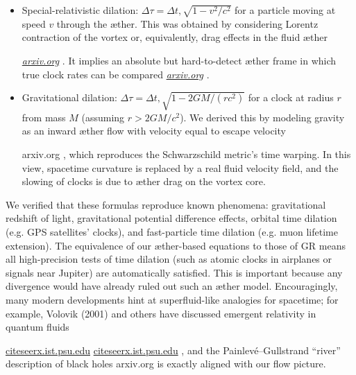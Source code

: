 \documentclass[aps,preprint,superscriptaddress]{revtex4}
\begin{document}
\begin{itemize}

\item
Special-relativistic dilation: $\displaystyle \Delta \tau = \Delta t,\sqrt{1-v^2/c^2}$ for a particle moving at speed $v$ through the æther. This was obtained by considering Lorentz contraction of the vortex or, equivalently, drag effects in the fluid æther

\href{https://arxiv.org/pdf/2012.07395#:~:text=which%20contains%20the%20familiar%20Lorentz,the%20Lorentz%20factor}{\textit{arxiv.org}}
. It implies an absolute but hard-to-detect æther frame in which true clock rates can be compared
\href{https://arxiv.org/pdf/physics/0611077#:~:text=We%20should%20note%20that%2C%20when,a%20state%20of%20absolute%20rest}{\textit{arxiv.org}}
.




\item
Gravitational dilation: $\displaystyle \Delta \tau = \Delta t,\sqrt{1-2GM/(r c^2)}$ for a clock at radius $r$ from mass $M$ (assuming $r>2GM/c^2$). We derived this by modeling gravity as an inward æther flow with velocity equal to escape velocity

arxiv.org
, which reproduces the Schwarzschild metric’s time warping. In this view, spacetime curvature is replaced by a real fluid velocity field, and the slowing of clocks is due to æther drag on the vortex core.




\end{itemize}

We verified that these formulas reproduce known phenomena: gravitational redshift of light, gravitational potential difference effects, orbital time dilation (e.g. GPS satellites’ clocks), and fast-particle time dilation (e.g. muon lifetime extension). The equivalence of our æther-based equations to those of GR means all high-precision tests of time dilation (such as atomic clocks in airplanes or signals near Jupiter) are automatically satisfied. This is important because any divergence would have already ruled out such an æther model. Encouragingly, many modern developments hint at superfluid-like analogies for spacetime; for example, Volovik (2001) and others have discussed emergent relativity in quantum fluids

\href{https://citeseerx.ist.psu.edu/document?repid=rep1&type=pdf&doi=25483f1ebc9dc442a9f1505a49d96eb35e92e3f4#:~:text=al,related%20to%20this%20hypothesis%2C%20including}{citeseerx.ist.psu.edu}
 \href{https://citeseerx.ist.psu.edu/document?repid=rep1&type=pdf&doi=25483f1ebc9dc442a9f1505a49d96eb35e92e3f4#:~:text=45,on%20General%20Relativity%20and%20Relativistic}{citeseerx.ist.psu.edu}
, and the Painlevé–Gullstrand “river” description of black holes arxiv.org
 is exactly aligned with our flow picture.
\end{document}
